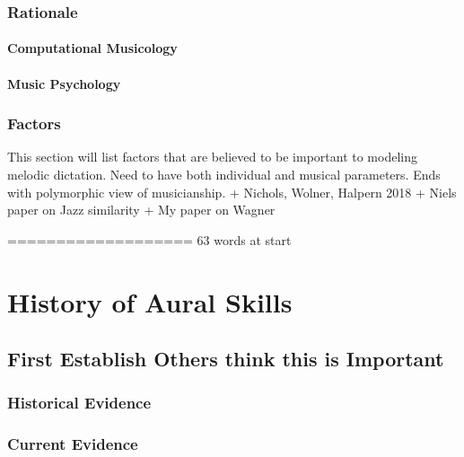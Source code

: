 \documentclass[]{book}
\theoremstyle{definition}
\theoremstyle{definition}
\theoremstyle{definition}
\theoremstyle{remark}
\begin{document}
\hypertarget{rationale}{%
\subsection{Rationale}\label{rationale}}

\hypertarget{computational-musicology-1}{%
\subsubsection{Computational
Musicology}\label{computational-musicology-1}}

\hypertarget{music-psychology}{%
\subsubsection{Music Psychology}\label{music-psychology}}

\hypertarget{factors}{%
\subsection{Factors}\label{factors}}

This section will list factors that are believed to be important to
modeling melodic dictation. Need to have both individual and musical
parameters. Ends with polymorphic view of musicianship. + Nichols,
Wolner, Halpern 2018 + Niels paper on Jazz similarity + My paper on
Wagner

=================== 63 words at start

\hypertarget{history-of-aural-skills}{%
\chapter{History of Aural Skills}\label{history-of-aural-skills}}

\hypertarget{first-establish-others-think-this-is-important}{%
\section{First Establish Others think this is
Important}\label{first-establish-others-think-this-is-important}}

\hypertarget{historical-evidence}{%
\subsection{Historical Evidence}\label{historical-evidence}}

\hypertarget{current-evidence}{%
\subsection{Current Evidence}\label{current-evidence}}
\end{document}
